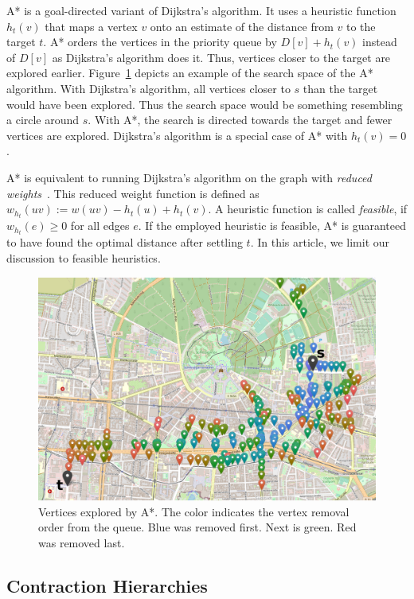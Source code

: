 \documentclass[manuscript,review]{acmart}
\begin{document}
A* is a goal-directed variant of Dijkstra's algorithm.
It uses a heuristic function $h_t(v)$ that maps a vertex $v$ onto an estimate of the distance from $v$ to the target $t$.
A* orders the vertices in the priority queue by $D[v] + h_t(v)$ instead of $D[v]$ as Dijkstra's algorithm does it.
Thus, vertices closer to the target are explored earlier.
Figure~\ref{img:search-space} depicts an example of the search space of the A* algorithm.
With Dijkstra's algorithm, all vertices closer to $s$ than the target would have been explored.
Thus the search space would be something resembling a circle around $s$.
With A*, the search is directed towards the target and fewer vertices are explored.
Dijkstra's algorithm is a special case of A* with $h_t(v)=0$.

A* is equivalent to running Dijkstra's algorithm on the graph with \emph{reduced weights}~\cite{hnr-afbhd-68}.
This reduced weight function is defined as $w_{h_t}(uv) := w(uv) - h_t(u) + h_t(v)$.
A heuristic function is called \emph{feasible}, if $w_{h_t}(e) \geq 0$ for all edges $e$.
If the employed heuristic is feasible, A* is guaranteed to have found the optimal distance after settling $t$.
In this article, we limit our discussion to feasible heuristics.

\begin{figure}
\centering
\includegraphics[width=.6\columnwidth]{fig/searchspace_st.png}
\caption{Vertices explored by A*. The color indicates the vertex removal order from the queue. Blue was removed first. Next is green. Red was removed last.}
\label{img:search-space}
\end{figure}

\subsection{Contraction Hierarchies}
\end{document}
